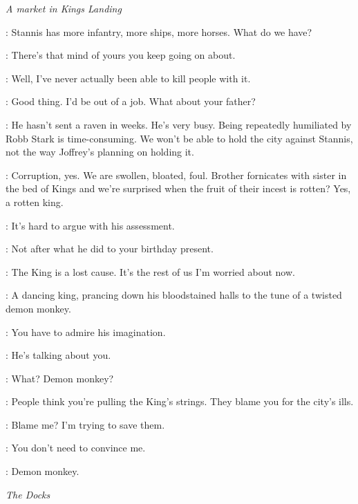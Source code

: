 \scene

\textit{A market in Kings Landing} 


\TYRION: Stannis has more infantry, more ships, more horses. What do we have? 

\BRONN: There's that mind of yours you keep going on about. 

\TYRION: Well, I've never actually been able to kill people with it. 

\BRONN: Good thing. I'd be out of a job. What about your father? 

\TYRION: He hasn't sent a raven in weeks. He's very busy. Being repeatedly humiliated by Robb Stark is time-consuming. We won't be able to hold the city against Stannis, not the way Joffrey's planning on holding it. 


\PROTESTER: Corruption, yes. We are swollen, bloated, foul. Brother fornicates with sister in the bed of Kings and we're surprised when the fruit of their incest is rotten? Yes, a rotten king. 


\TYRION: It's hard to argue with his assessment. 

\BRONN: Not after what he did to your birthday present. 

\TYRION: The King is a lost cause. It's the rest of us I'm worried about now. 

\PROTESTER: A dancing king, prancing down his bloodstained halls to the tune of a twisted demon monkey. 

\TYRION: You have to admire his imagination. 

\BRONN: He's talking about you. 

\TYRION: What? Demon monkey? 

\BRONN: People think you're pulling the King's strings. They blame you for the city's ills. 

\TYRION: Blame me? I'm trying to save them. 

\BRONN: You don't need to convince me. 

\TYRION: Demon monkey. 


\scene

\textit{The Docks} 


